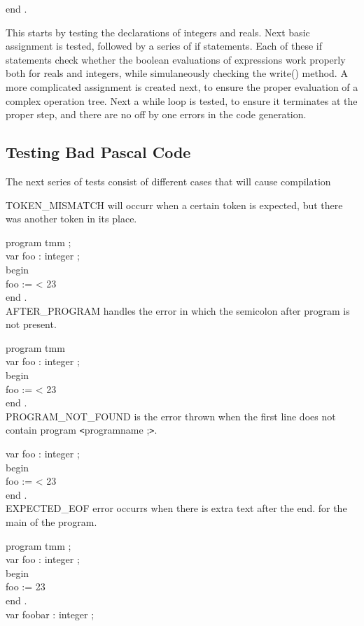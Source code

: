 \documentclass[12pt]{scrreprt}
\newcommand{\tab}{\hspace*{2em}}
\begin{document}
end . 



This starts by testing the declarations of integers and reals. Next basic assignment
is tested, followed by a series of if statements. Each of these if statements
check whether the boolean evaluations of expressions work properly
both for reals and integers, while simulaneously checking the write()
method. A more complicated assignment is created next, to ensure the proper
evaluation of a complex operation tree. Next a while loop is tested, to 
ensure it terminates at the proper step, and there are no off by one errors
in the code generation.


\subsection{Testing Bad Pascal Code}
The next series of tests consist of different cases that will cause compilation

TOKEN\_MISMATCH will occurr when a certain token is expected, but there was another
token in its place.

program tmm ; \\
var foo : integer ; \\
begin \\
\tab foo := < 23 \\
end . \\


AFTER\_PROGRAM handles the error in which the semicolon after program is not 
present.

program tmm  \\
var foo : integer ; \\
begin \\
\tab foo := < 23 \\
end . \\

PROGRAM\_NOT\_FOUND is the error thrown when the first line does not
contain program \verb|<|programname ;\verb|>|.

var foo : integer ; \\
begin \\
\tab foo := < 23 \\
end . \\

EXPECTED\_EOF error occurrs when there is extra text after the end. for the
main of the program.

program tmm ; \\
var foo : integer ; \\
begin \\
\tab foo :=  23 \\
end . \\
var foobar : integer ; \\
\end{document}
